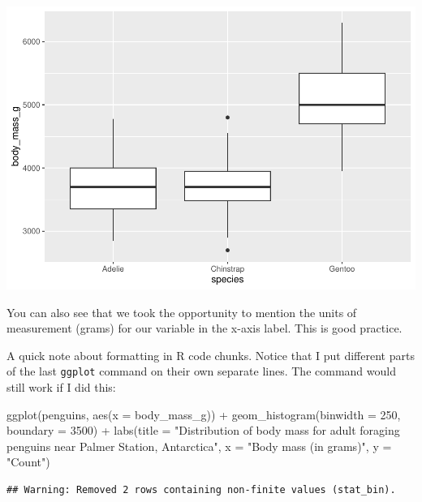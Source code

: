 \documentclass[
]{book}
\newenvironment{Shaded}{\begin{snugshade}}{\end{snugshade}}
\newcommand{\AttributeTok}[1]{\textcolor[rgb]{0.77,0.63,0.00}{#1}}
\newcommand{\DecValTok}[1]{\textcolor[rgb]{0.00,0.00,0.81}{#1}}
\newcommand{\FunctionTok}[1]{\textcolor[rgb]{0.00,0.00,0.00}{#1}}
\newcommand{\NormalTok}[1]{#1}
\newcommand{\SpecialCharTok}[1]{\textcolor[rgb]{0.00,0.00,0.00}{#1}}
\newcommand{\StringTok}[1]{\textcolor[rgb]{0.31,0.60,0.02}{#1}}
\begin{document}
\includegraphics{intro_stats_files/figure-latex/unnamed-chunk-115-1.pdf}

You can also see that we took the opportunity to mention the units of measurement (grams) for our variable in the x-axis label. This is good practice.

A quick note about formatting in R code chunks. Notice that I put different parts of the last \texttt{ggplot} command on their own separate lines. The command would still work if I did this:

\begin{Shaded}
\begin{Highlighting}[]
\FunctionTok{ggplot}\NormalTok{(penguins, }\FunctionTok{aes}\NormalTok{(}\AttributeTok{x =}\NormalTok{ body\_mass\_g)) }\SpecialCharTok{+} \FunctionTok{geom\_histogram}\NormalTok{(}\AttributeTok{binwidth =} \DecValTok{250}\NormalTok{, }\AttributeTok{boundary =} \DecValTok{3500}\NormalTok{) }\SpecialCharTok{+} \FunctionTok{labs}\NormalTok{(}\AttributeTok{title =} \StringTok{"Distribution of body mass for adult foraging penguins near Palmer Station, Antarctica"}\NormalTok{, }\AttributeTok{x =} \StringTok{"Body mass (in grams)"}\NormalTok{, }\AttributeTok{y =} \StringTok{"Count"}\NormalTok{)}
\end{Highlighting}
\end{Shaded}

\begin{verbatim}
## Warning: Removed 2 rows containing non-finite values (stat_bin).
\end{verbatim}
\end{document}
